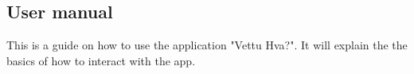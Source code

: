 \begin{appendices}

\clearpage
\chapter{User manual}
\label{app:user_manual}
This is a guide on how to use the application "Vettu Hva?". It will explain the the basics of how to interact with the app. 



\end{appendices}
